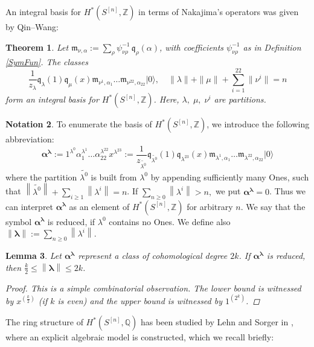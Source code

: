 \documentclass{amsart}
\newcommand{\hilb}[1]{^{[#1]}}
\newcommand{\vac}{|0\rangle}
\newcommand{\One}{1}
\newcommand{\IQ}{\mathbb{Q}}
\newcommand{\IZ}{\mathbb{Z}}
\newcommand{\km}{\mathfrak{m}}
\newcommand{\kq}{\mathfrak{q}}
\theoremstyle{plain}
\newtheorem{theorem}{Theorem}[section]
\newtheorem{lemma}[theorem]{Lemma}
\theoremstyle{definition}
\newtheorem{notation}[theorem]{Notation}
\theoremstyle{remark}
\begin{document}
An integral basis for $H^\ast(S\hilb{n},\IZ)$ in terms of Nakajima's operators was given by Qin--Wang:
\begin{theorem} \cite[Thm. 5.4.]{QinWang} Let $\km_{\nu,\alpha} := \sum_\rho \psi_{\nu\rho}^{-1}\,\kq_{\rho}(\alpha)$, with coefficients $ \psi_{\nu\rho}^{-1}$ as in Definition \ref{SymFun}. The classes
$$ \frac{1}{z_\lambda} \kq_\lambda(1)\kq_\mu(x)\km_{\nu^1,\alpha_1}\ldots\km_{\nu^{22},\alpha_{22}}\vac,\quad \|\lambda\| +\|\mu\| + \sum_{i=1}^{22}\|\nu^i\| = n
$$ 
form an integral basis for $H^\ast(S\hilb{n},\IZ)$. Here,
$\lambda,\; \mu,\; \nu^i$ are partitions.
\end{theorem}
\begin{notation}
To enumerate the basis of $H^\ast(S\hilb{n},\IZ)$, we introduce the following abbreviation:
$$ \boldsymbol\alpha^{\boldsymbol\lambda} :=
\One^{\lambda^0} \alpha_1^{\lambda^1}\ldots\alpha_{22}^{\lambda^{22}}x^{\lambda^{23}} :=
\frac{1}{z_{\widetilde{\lambda^0}} }
\kq_{\widetilde{\lambda^0}}(\One)\kq_{\lambda^{23}}(x)\km_{\lambda^1,\alpha_1}\ldots\km_{\lambda^{22},\alpha_{22}}\vac
$$
where the partition $\widetilde{\lambda^0}$ is built from $\lambda^0$ by appending sufficiently many Ones, such that $\left\|\widetilde{\lambda^0}\right\| +\sum_{i\geq 1}\left\|\lambda^i\right\| = n $. If $\sum_{n\geq 0}\left\|\lambda^i\right\| > n, $ we put $\boldsymbol\alpha^{\boldsymbol\lambda}=0$. Thus we can interpret $\boldsymbol\alpha^{\boldsymbol\lambda}$ as an element of $H^\ast(S\hilb{n},\IZ)$ for arbitrary $n$. We say that the symbol $\boldsymbol\alpha^{\boldsymbol\lambda}$ is reduced, if $\lambda^0$ contains no Ones. We define also $\left\|\boldsymbol\lambda\right\| := \sum_{n\geq 0}\left\|\lambda^i\right\|$. 
\end{notation}
\begin{lemma}\label{degBound}
Let $\boldsymbol\alpha^{\boldsymbol\lambda}$ represent a class of cohomological degree $2k$. If $\boldsymbol\alpha^{\boldsymbol\lambda}$ is reduced, then $\frac{k}{2}\leq\left\|\boldsymbol{\lambda}\right\| \leq 2k$.
\begin{proof} This is a simple combinatorial observation. The lower bound is witnessed by $x^{(\frac{k}{2})}$ (if $k$ is even)  and the upper bound is witnessed by $\One^{(2^k)}$.
\end{proof}
\end{lemma}
The ring structure of $H^\ast(S\hilb{n}, \IQ)$ has been studied by Lehn and Sorger in \cite{LehnSorger}, where an explicit algebraic model is constructed, which we recall briefly:
\end{document}
